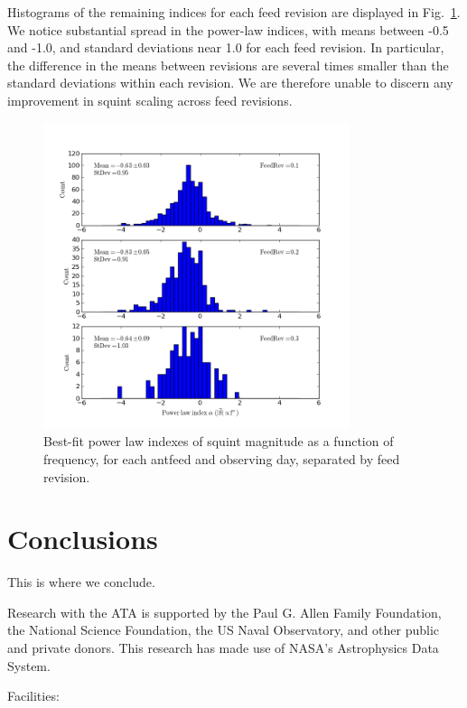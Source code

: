 \documentclass[preprint]{aastex}
\begin{document}
Histograms of the remaining indices for each feed revision are displayed in 
Fig.~\ref{fig.powerlaws}.  We notice substantial spread in the power-law indices, with means between -0.5 and -1.0, and standard deviations near 1.0 for each feed revision.  In particular, the difference in the means between revisions are several times smaller than the standard deviations within each revision. We are therefore unable to discern any improvement in squint scaling across feed revisions.

\begin{figure}[htb]
\begin{center}
\includegraphics[width=0.8\textwidth]{images/powerlaw_rev}
\caption{Best-fit power law indexes of squint magnitude as a function of frequency, for each antfeed and observing day, separated by feed revision. \label{fig.powerlaws}}
\end{center}
\end{figure}

\section{Conclusions}\label{s.conclusions}
This is where we conclude.


\acknowledgments
Research with the ATA is supported by the Paul G. Allen Family
Foundation, the National Science Foundation, the US Naval Observatory,
and other public and private donors. This research has made use of
NASA's Astrophysics Data System.

Facilities: 



\end{document}
